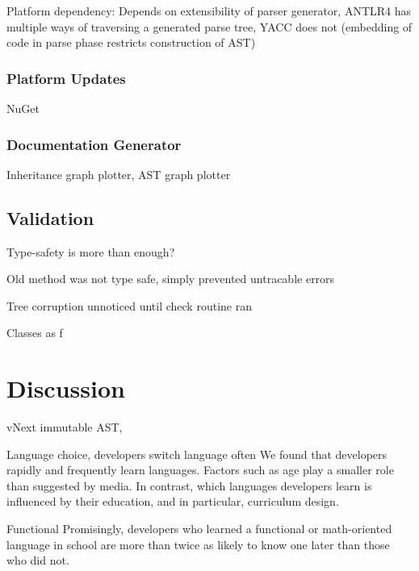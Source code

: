 \documentclass[twoside,openright]{uva-bachelor-thesis}
\begin{document}
			Platform dependency: Depends on extensibility of parser generator, ANTLR4 has multiple ways of traversing a generated parse tree, YACC does not (embedding of code in parse phase restricts construction of AST)
			
		\subsection{Platform Updates}
			NuGet
			
		\subsection{Documentation Generator}
			Inheritance graph plotter, AST graph plotter
	
	\section{Validation}
		Type-safety is more than enough?
		
		Old method was not type safe, simply prevented untracable errors
		
		Tree corruption unnoticed until check routine ran
		
		Classes as f
	
\chapter{Discussion}
	vNext immutable AST, 
	
	Language choice, developers switch language often
		We found that developers rapidly and frequently learn
		languages. Factors such as age play a smaller role than suggested
		by media. In contrast, which languages developers
		learn is influenced by their education, and in particular, curriculum
		design.
		
	Functional
		Promisingly, developers who learned a functional or	math-oriented language in school are more than twice as likely to know one later than those who did not.



\end{document}
